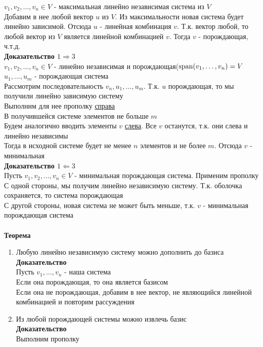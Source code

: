 \documentclass[12pt]{article}
\begin{document}
$v_1, v_2, \ldots, v_n \in V$ - максимальная линейно независимая система из $V$\\
Добавим в нее любой вектор $u$ из $V$. Из максимальности новая система будет линейно зависимой. Отсюда $u$ - линейная комбинация $v$. Т.к. вектор любой, то любой вектор из $V$ является линейной комбинацией $v$. Тогда $v$ - порождающая, ч.т.д.\\
\textbf{Доказательство $1 \Rightarrow 3$}\\
$v_1, v_2, \ldots, v_n \in V$ - линейно независимая и порождающая($\operatorname{span}(v_1, \ldots, v_n) = V$\\
$u_1, \ldots, u_m$ - порождающая система\\
Рассмотрим последовательность $v_n, u_1, \ldots, u_m$. Т.к. $u$ порождающая, то мы получили линейно зависимую систему\\
Выполним для нее прополку \underline{справа}\\
В получившейся системе элементов не больше $m$\\
Будем аналогично вводить элементы $v$ \underline{слева}. Все $v$ останутся, т.к. они слева и линейно независимы\\
Тогда в исходной системе будет не менее $n$ элементов и не более $m$. Отсюда $v$ - минимальная\\
\textbf{Доказательство $1 \Leftarrow 3$}\\
Пусть $v_1, v_2, \ldots, v_n \in V$ - минимальная порождающая система. Применим прополку\\
С одной стороны, мы получим линейно независимую систему. Т.к. оболочка сохраняется, то система порождающая\\
С другой стороны, новая система не может быть меньше, т.к. $v$ - минимальная порождающая система\\\\
\textbf{Теорема}
\begin{enumerate}
    \item Любую линейно независимую систему можно дополнить до базиса\\
    \textbf{Доказательство}\\
    Пусть $v_1, \ldots, v_n$ - наша система\\
    Если она порождающая, то она является базисом\\
    Если она не порождающая, добавим в нее вектор, не являющийся линейной комбинацией и повторим рассуждения
    \item Из любой порождающей системы можно извлечь базис\\
    \textbf{Доказательство}\\
    Выполним прополку
\end{enumerate}
\end{document}
